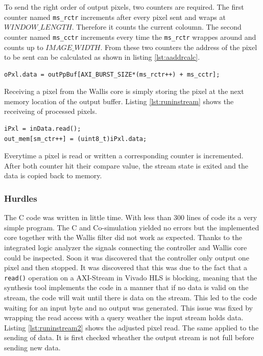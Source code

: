 To send the right order of output pixels, two counters are required. The first
counter named \texttt{ms\_rctr} increments after every pixel sent and wraps at
$WINDOW\_LENGTH$. Therefore it counts the current coloumn. The second counter
named \texttt{ms\_cctr} increments every time the \texttt{ms\_rctr} wrappes
around and counts up to $IMAGE\_WIDTH$. From these two counters the address of
the pixel to be sent can be calculated as shown in listing \ref{lst:aaddrcalc}.

\begin{minipage}{\textwidth}
\begin{lstlisting}[style=CStyle, caption=Pixel send address calculation,
label=lst:aaddrcalc]
oPxl.data = outPpBuf[AXI_BURST_SIZE*(ms_rctr++) + ms_cctr];\end{lstlisting}
\end{minipage}

Receiving a pixel from the Wallis core is simply storing the pixel at the next
memory location of the
output buffer. Listing \ref{lst:runinstream} shows the receiveing of processed
pixels.

\begin{minipage}{\textwidth}
\begin{lstlisting}[style=CStyle, caption=Pixel read store,
label=lst:runinstream]
iPxl = inData.read();
out_mem[sm_ctr++] = (uint8_t)iPxl.data;\end{lstlisting}
\end{minipage}

Everytime a pixel is read or written a corresponding counter is incremented.
After both counter hit their compare value, the stream state is exited and the
data is copied back to memory.

\subsubsection*{Hurdles}
The C code was written in little time. With less than 300 lines of code its a
very simple program. The C and Co-simulation yielded no errors but the
implemented core together with the Wallis filter did not work as expected.
Thanks to the integrated logic analyzer the signals connecting the controller
and Wallis core could be inspected. Soon it was discovered that the controller
only output one pixel and then stopped. It was discovered that this was due to
the fact that a \texttt{read()} operation on a AXI-Stream in Vivado HLS is
blocking, meaning that the synthesis tool implements the code in a  manner that
if no data is
valid on the stream, the code will wait until there is data on the stream. This
led to the code waiting for an input byte and no output was generated. This
issue was fixed by wrapping the read access with a query weather the input
stream holds data. Listing \ref{lst:runinstream2} shows the adjusted pixel read.
The same applied to the sending of data. It is first checked wheather the output
stream is not full before sending new data.

